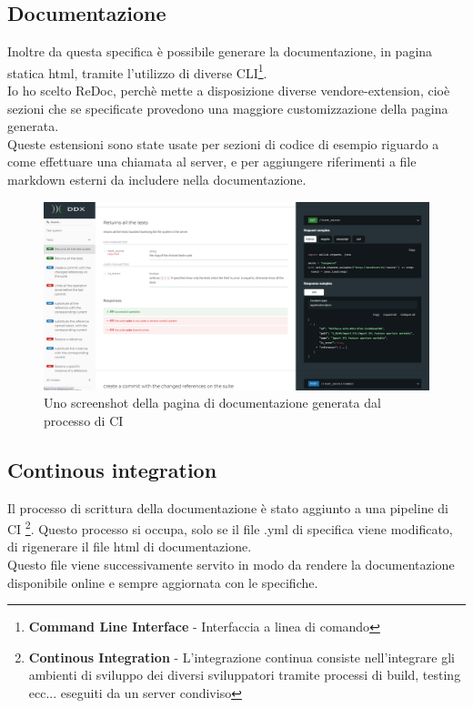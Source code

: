             \subsection{Documentazione\label{apidoc}}
                Inoltre da questa specifica è possibile generare la documentazione, in pagina statica html,
                tramite l'utilizzo di diverse CLI\footnote{\textbf{Command Line Interface} - Interfaccia a linea di comando}.\\
                Io ho scelto ReDoc, perchè mette a disposizione diverse vendore-extension, cioè sezioni che
                se specificate provedono una maggiore customizzazione della pagina generata.\\
                Queste estensioni sono state usate per sezioni di codice di esempio riguardo a come effettuare una chiamata al server, e per aggiungere riferimenti a file markdown esterni da includere nella documentazione.\\
                
                \begin{figure}[h]
                    \includegraphics[width=\textwidth]{images/documentation.png}
                    \caption{Uno screenshot della pagina di documentazione generata dal processo di CI}
                \end{figure}

            \subsection{Continous integration}
                Il processo di scrittura della documentazione è stato aggiunto a una pipeline di CI
                \footnote{\textbf{Continous Integration} - L'integrazione continua consiste nell'integrare gli ambienti di sviluppo dei diversi sviluppatori tramite processi di build, testing ecc... eseguiti da un server condiviso}.
                Questo processo si occupa, solo se il file .yml di specifica viene modificato, di 
                rigenerare il file html di documentazione.\\
                Questo file viene successivamente servito in modo da rendere la documentazione 
                disponibile online e sempre aggiornata con le specifiche.

